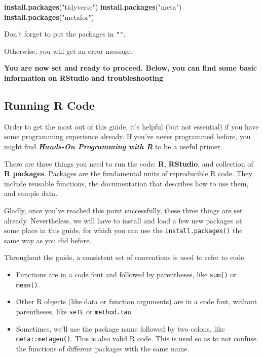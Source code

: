 \documentclass[]{book}
\newenvironment{Shaded}{\begin{snugshade}}{\end{snugshade}}
\newcommand{\KeywordTok}[1]{\textcolor[rgb]{0.13,0.29,0.53}{\textbf{#1}}}
\newcommand{\StringTok}[1]{\textcolor[rgb]{0.31,0.60,0.02}{#1}}
\newcommand{\NormalTok}[1]{#1}
\providecommand{\tightlist}{%
  \setlength{\itemsep}{0pt}\setlength{\parskip}{0pt}}
\theoremstyle{definition}
\theoremstyle{definition}
\theoremstyle{definition}
\theoremstyle{remark}
\begin{document}
\begin{Shaded}
\begin{Highlighting}[]
\KeywordTok{install.packages}\NormalTok{(}\StringTok{"tidyverse"}\NormalTok{)}
\KeywordTok{install.packages}\NormalTok{(}\StringTok{"meta"}\NormalTok{)}
\KeywordTok{install.packages}\NormalTok{(}\StringTok{"metafor"}\NormalTok{)}
\end{Highlighting}
\end{Shaded}

\begin{rmdachtung}
Don't forget to put the packages in \texttt{""}.

Otherwise, you will get an error message.
\end{rmdachtung}

\textbf{You are now set and ready to proceed. Below, you can find some
basic information on RStudio and troubleshooting}

\subsection{Running R Code}\label{running-r-code}

Order to get the most out of this guide, it's helpful (but not
essential) if you have some programming experience already. If you've
never programmed before, you might find \textbf{\emph{Hands-On
Programming with R}} \citep{grolemund2014hands} to be a useful primer.

There are three things you need to run the code: \textbf{R},
\textbf{RStudio}, and collection of \textbf{R packages}. Packages are
the fundamental units of reproducible R code. They include reusable
functions, the documentation that describes how to use them, and sample
data.

Gladly, once you've reached this point successfully, these three things
are set already. Nevertheless, we will have to install and load a few
new packages at some place in this guide, for which you can use the
\texttt{install.packages()} the same way as you did before.

Throughout the guide, a consistent set of conventions is used to refer
to code:

\begin{itemize}
\tightlist
\item
  Functions are in a code font and followed by parentheses, like
  \texttt{sum()} or \texttt{mean()}.
\item
  Other R objects (like data or function arguments) are in a code font,
  without parentheses, like \texttt{seTE} or \texttt{method.tau}.
\item
  Sometimes, we'll use the package name followed by two colons, like
  \texttt{meta::metagen()}. This is also valid R code. This is used so
  as to not confuse the functions of different packages with the same
  name.
\end{itemize}
\end{document}
